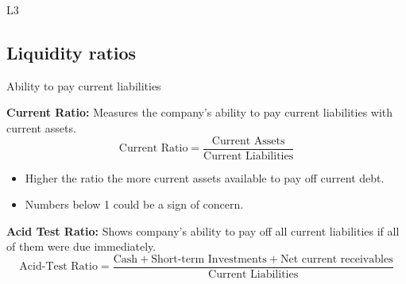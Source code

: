 \begin{example}
\end{example}

\begin{example}
    L3
\end{example}

\subsection{Liquidity ratios}
\begin{definition} Ability to pay current liabilities

    \textbf{Current Ratio:} Measures the company's ability to pay current liabilities with current assets.
    \begin{equation}
        \text{Current Ratio} = \frac{\text{Current Assets}}{\text{Current Liabilities}}
    \end{equation}
    \begin{itemize}
        \item Higher the ratio the more current assets available to pay off current debt.
        \item Numbers below 1 could be a sign of concern.
    \end{itemize}
    \vspace{1em}
    \textbf{Acid Test Ratio:} Shows company's ability to pay off all current liabilities if all of them were due immediately.
    \begin{equation}
        \text{Acid-Test Ratio} = \frac{\text{Cash} + \text{Short-term Investments} + \text{Net current receivables}}{\text{Current Liabilities}}
    \end{equation}
\end{definition}

